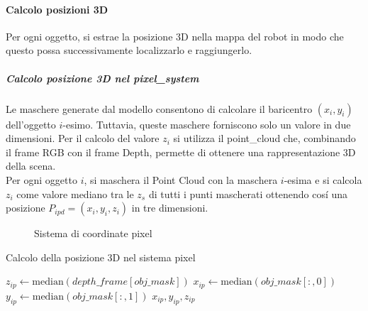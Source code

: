 \paragraph{Calcolo posizioni 3D}\label{paragraph:positions}
Per ogni oggetto, si estrae la posizione 3D nella mappa del robot in modo che questo possa successivamente localizzarlo e raggiungerlo.
\subparagraph{Calcolo posizione 3D nel \gls{pixel_system}}
Le maschere generate dal modello consentono di calcolare il baricentro $(x_i, y_i)$ dell'oggetto $i$-esimo. Tuttavia, queste maschere forniscono solo un valore in due dimensioni. Per il calcolo del valore $z_i$ si utilizza il \Gls{point_cloud} che, combinando il frame RGB con il frame Depth, permette di ottenere una rappresentazione 3D della scena. \\
Per ogni oggetto $i$, si maschera il Point Cloud con la maschera $i$-esima e si calcola $z_i$ come valore mediano tra le $z_s$ di tutti i punti mascherati ottenendo cosí una posizione $P_{ipd} = (x_i, y_i, z_i)$ in tre dimensioni.
\begin{figure}[h]
  \centering
  \caption{Sistema di coordinate pixel}
\end{figure}

\begin{algorithm}
  \caption{Calcolo della posizione 3D nel sistema pixel}
  \begin{algorithmic}[1]
    \State $z_{ip} \gets \text{median}(depth\_frame[obj\_mask])$ 
    \State $x_{ip} \gets \text{median}(obj\_mask[:, 0])$
    \State $y_{ip} \gets \text{median}(obj\_mask[:, 1])$
    \State \Return $x_{ip}, y_{ip}, z_{ip}$
    \EndProcedure
  \end{algorithmic}
\end{algorithm}

